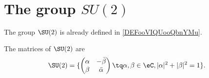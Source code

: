 
\section{The group \texorpdfstring{$SU(2)$}{SU2}}

The group \( \SU(2)\) is already defined in \ref{DEFooVIQUooQbnYMu}.

\begin{proposition}       \label{PROPooZMPLooUFyAPW}
    The matrices of \( \SU(2)\) are
    \begin{equation}
        \SU(2)=\{ \begin{pmatrix}
        \alpha    &   -\bar \beta    \\ 
    \beta    &   \bar \alpha    
\end{pmatrix}\tq \alpha,\beta\in \eC,| \alpha |^2+| \beta |^2=1\}.
    \end{equation}
\end{proposition}

